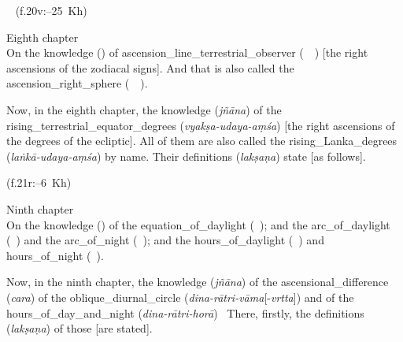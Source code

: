 
\begin{multicols}{2}
\noindent\reversemarginpar{}%
\columnbreak

\noindent\normalmarginpar{}%
~%
\enskip(f.\thinspace 20v:--25~Kh)
\end{multicols}%
%
\begin{multicols}{2}
Eighth chapter\\
On the \gls{knowledge} (\marifat) of \gls{ascension_line_terrestrial_observer} (\matali\ \khatt\idafaconsonant\ \istiva) [\ie the right ascensions of the zodiacal signs]. And that is also called the \gls{ascension_right_sphere} (\matali\ \falak\idafaconsonant\ \mustaqim).
\columnbreak

Now, in the eighth chapter, the \gls{knowledge} (\textit{jñāna}) of the \gls{rising_terrestrial_equator_degrees} (\textit{vyakṣa-udaya-aṃśa}) [\ie the right ascensions of the degrees of the ecliptic]. All of them are also called the \gls{rising_Lanka_degrees} (\textit{laṅkā-udaya-aṃśa}) by name. Their \glspl{definition} (\textit{lakṣaṇa}) state [as follows].
\end{multicols}
\medskip

\begin{multicols}{2}
\noindent\reversemarginpar{}%
\columnbreak

\noindent\normalmarginpar{}%
%
\enskip (f.\thinspace 21r:--6~Kh)
\end{multicols}%
%
\begin{multicols}{2}
Ninth chapter\\
On the \gls{knowledge} (\marifat) of the \gls{equation_of_daylight} (\tadil\ \alnahar); and the \gls{arc_of_daylight} (\qaws\ \alnahar) and the \gls{arc_of_night} (\qaws\ \allayl); and the 
\gls{hours_of_daylight} (\saat\ \alnahar) and \gls{hours_of_night} (\saat\ \allayl).
\columnbreak

Now, in the ninth chapter, the \gls{knowledge} (\textit{jñāna}) of the \gls{ascensional_difference} (\textit{cara}) of the \gls{oblique_diurnal_circle} (\textit{dina-rātri-vāma}[-\textit{vrtta}]) and of the \gls{hours_of_day_and_night} (\textit{dina-rātri-horā}) \etcp\ There, firstly, the \glspl{definition} (\textit{lakṣaṇa}) of those [are stated].
\end{multicols}
\medskip

